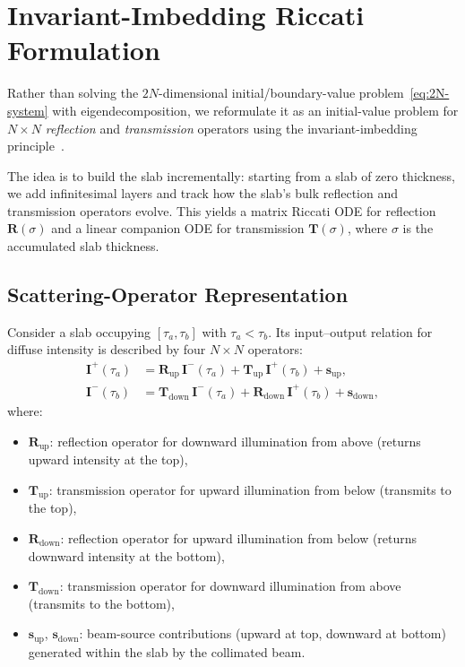 \documentclass[11pt,a4paper]{article}
\newcommand{\vect}[1]{\bm{#1}}
\newcommand{\mat}[1]{\mathbf{#1}}
\theoremstyle{definition}
\begin{document}
\section{Invariant-Imbedding Riccati Formulation}\label{sec:riccati}

Rather than solving the $2N$-dimensional initial/boundary-value
problem~\eqref{eq:2N-system} with eigendecomposition, we reformulate it
as an initial-value problem for $N\!\times\!N$ \emph{reflection} and
\emph{transmission} operators using the invariant-imbedding
principle~\cite{ambarzumian1943,bellman1960}.

The idea is to build the slab incrementally: starting from a slab of
zero thickness, we add infinitesimal layers and track how the
slab's bulk reflection and transmission operators evolve.  This yields
a matrix Riccati ODE for reflection $\mat{R}(\sigma)$ and a linear
companion ODE for transmission $\mat{T}(\sigma)$, where $\sigma$ is
the accumulated slab thickness.

\subsection{Scattering-Operator Representation}\label{sec:scat-ops}

Consider a slab occupying $[\tau_a, \tau_b]$ with $\tau_a < \tau_b$.
Its input--output relation for diffuse intensity is described by four
$N\!\times\!N$ operators:
\begin{align}
  \vect{I}^+(\tau_a) &= \mat{R}_{\mathrm{up}}\,\vect{I}^-(\tau_a)
    + \mat{T}_{\mathrm{up}}\,\vect{I}^+(\tau_b) + \vect{s}_{\mathrm{up}},
    \label{eq:scat-up} \\
  \vect{I}^-(\tau_b) &= \mat{T}_{\mathrm{down}}\,\vect{I}^-(\tau_a)
    + \mat{R}_{\mathrm{down}}\,\vect{I}^+(\tau_b) + \vect{s}_{\mathrm{down}},
    \label{eq:scat-down}
\end{align}
where:
\begin{itemize}[nosep]
  \item $\mat{R}_{\mathrm{up}}$: reflection operator for downward
    illumination from above (returns upward intensity at the top),
  \item $\mat{T}_{\mathrm{up}}$: transmission operator for upward
    illumination from below (transmits to the top),
  \item $\mat{R}_{\mathrm{down}}$: reflection operator for upward
    illumination from below (returns downward intensity at the bottom),
  \item $\mat{T}_{\mathrm{down}}$: transmission operator for downward
    illumination from above (transmits to the bottom),
  \item $\vect{s}_{\mathrm{up}}$, $\vect{s}_{\mathrm{down}}$: beam-source
    contributions (upward at top, downward at bottom) generated within
    the slab by the collimated beam.
\end{itemize}
\end{document}
